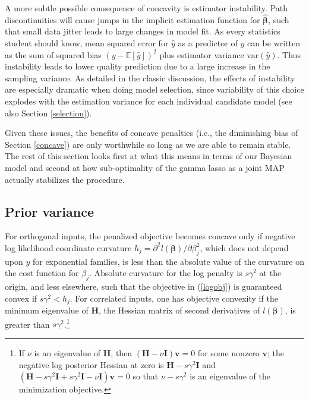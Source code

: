 \documentclass[12pt]{article}
\newcommand{\bs}[1]{\boldsymbol{#1}}
\newcommand{\mr}[1]{\mathrm{#1}}
\newcommand{\bm}[1]{\mathbf{#1}}
\newcommand{\ds}[1]{\mathds{#1}}
\begin{document}
A more subtle possible consequence of concavity is estimator instability. Path
discontinuities will cause jumps in the implicit estimation function for
$\bs{\hat\beta}$, such that small data jitter leads to large changes in model
fit. As every statistics student should know, mean squared error for $\hat y$
as a predictor of $y$ can be written as the sum of squared bias
$(y-\ds{E}[\hat y])^2$ plus estimator variance $\mr{var}(\hat y)$.  Thus
instability leads to lower quality prediction due to a large increase in the
sampling variance. As detailed in the classic \cite{breiman_heuristics_1996}
discussion, the effects of instability are especially dramatic when doing
model selection, since variability of this choice explodes with the estimation
variance for each individual candidate model (see also Section
\ref{selection}).

Given these issues, the benefits of concave penalties (i.e., the diminishing bias
of Section \ref{concave}) are only worthwhile so long as we are able to
remain stable.  The rest of this section looks first at what this means in
terms of our Bayesian model and second at how sub-optimality of the gamma
lasso as a joint MAP actually stabilizes the procedure.

\subsection{Prior variance}

For orthogonal inputs, the penalized objective becomes concave only if
negative log likelihood coordinate curvature $h_j = \partial^2 l(\bs{\beta})/\partial
\beta_j^2$, which does not depend upon $y$ for exponential families, is less
than the absolute value of the curvature on the cost function for $\beta_j$.
Absolute curvature for the log penalty is $s\gamma^2$ at the origin, and less
elsewhere, such that  the objective in (\ref{logobj}) is guaranteed convex if
$s\gamma^2 < h_j$.  For correlated inputs, one has objective convexity if the
minimum eigenvalue of $\bm{H}$, the Hessian matrix of second derivatives of
$l(\bs{\beta})$, is greater than $s\gamma^2$.\footnote{ \noindent If $\nu$ is an
eigenvalue of $\bm{H}$, then $(\bm{H} -
\nu \bm{I})\bm{v} = 0$ for some nonzero $\bm{v}$; the negative log posterior
Hessian at zero is $\bm{H} - s\gamma^2\bm{I}$ and $(\bm{H} - s\gamma^2\bm{I} + s\gamma^2\bm{I} -
\nu \bm{I})\bm{v} = 0$ so that 
$\nu - s\gamma^2$ is an eigenvalue of the minimization objective.}
\end{document}
